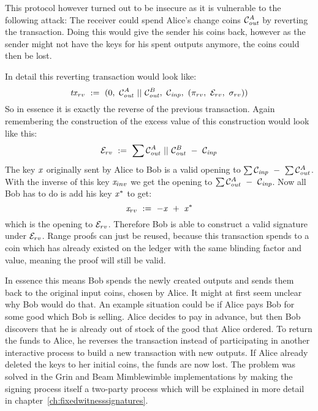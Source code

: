This protocol however turned out to be insecure as it is vulnerable to the following attack:
The receiver could spend Alice's change coins $\mathcal{C}_{\mathit{out}}^A$ by reverting the transaction.
Doing this would give the sender his coins back, however as the sender might not have the keys for his spent outputs anymore, the coins could then be lost.

In detail this reverting transaction would look like:
\[ \mathit{tx}_{rv} ~:=~ (0 ,~ \mathcal{C}_{\mathit{out}}^A ~||~ \mathcal{C}_{\mathit{out}}^B ,~ \mathcal{C}_{\mathit{inp}} ,~ (\pi_{rv} ,~ \mathcal{E}_{rv} ,~ \sigma_{rv}) ) \]
So in essence it is exactly the reverse of the previous transaction.
Again remembering the construction of the excess value of this construction would look like this:
\[ \mathcal{E}_{rv} ~:=~ \sum{\mathcal{C}_{\mathit{out}}^A ~||~\mathcal{C}_{\mathit{out}}^B ~-~\mathcal{C}_{\mathit{inp}}} \]
The key $\mathit{x}$ originally sent by Alice to Bob is a valid opening to $\sum{\mathcal{C}_{\mathit{inp}}} ~-~ \sum{\mathcal{C}_{\mathit{out}}^A}$. With the inverse of this key $\mathit{x}_{inv}$ we get the opening to $\sum{\mathcal{C}_{\mathit{out}}^A ~-~\mathcal{C}_{\mathit{inp}}}$.
Now all Bob has to do is add his key $\mathit{x}^*$ to get:
\[ \mathit{x}_{rv} ~:=~ -\mathit{x} ~+~ \mathit{x}^* \]
which is the opening to $\mathcal{E}_{rv}$.
Therefore Bob is able to construct a valid signature under $\mathcal{E}_{rv}$.
Range proofs can just be reused, because this transaction spends to a coin which has already existed on the ledger with the same blinding factor and value, meaning the proof will still be valid.

In essence this means Bob spends the newly created outputs and sends them back to the original input coins, chosen by Alice. It might at first seem unclear why Bob would do that.
An example situation could be if Alice pays Bob for some good which Bob is selling. Alice decides to pay in advance, but then Bob discovers that he is already out of stock of the good that Alice ordered.
To return the funds to Alice, he reverses the transaction instead of participating in another interactive process to build a new transaction with new outputs.
If Alice already deleted the keys to her initial coins, the funds are now lost.
The problem was solved in the Grin and Beam Mimblewimble implementations by making the signing process itself a two-party process which will be explained in more detail in chapter~\ref{ch:fixedwitnesssignatures}.

